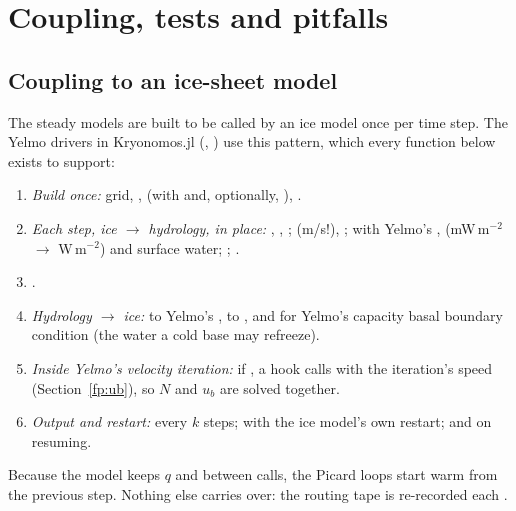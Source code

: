 \section{Coupling, tests and pitfalls}

\subsection{Coupling to an ice-sheet model}\label{sec:coupling}
The steady models are built to be called by an ice model once per time step. The Yelmo drivers in Kryonomos.jl
(, ) use this pattern, which every
function below exists to support:
\begin{enumerate}[leftmargin=1.5em]
\item \emph{Build once:} grid, ,  (with  and,
  optionally, ), .
\item \emph{Each step, ice $\to$ hydrology, in place:} , , ;  (m/s!),
  ;  with Yelmo's ,  (mW\,m$^{-2}$ $\to$
  W\,m$^{-2}$) and surface water; ; .
\item {}.
\item \emph{Hydrology $\to$ ice:}  to Yelmo's ,  to , and
   for Yelmo's capacity basal boundary condition (the water a cold base may
  refreeze).
\item \emph{Inside Yelmo's velocity iteration:} if , a hook calls  with the iteration's speed (Section~\ref{fp:ub}), so $N$ and $u_b$ are solved together.
\item \emph{Output and restart:}  every $k$ steps;  with the ice model's own restart;
   and  on resuming.
\end{enumerate}
Because the model keeps $q$ and  between calls, the Picard loops start warm from the previous step. Nothing else
carries over: the routing tape is re-recorded each .

